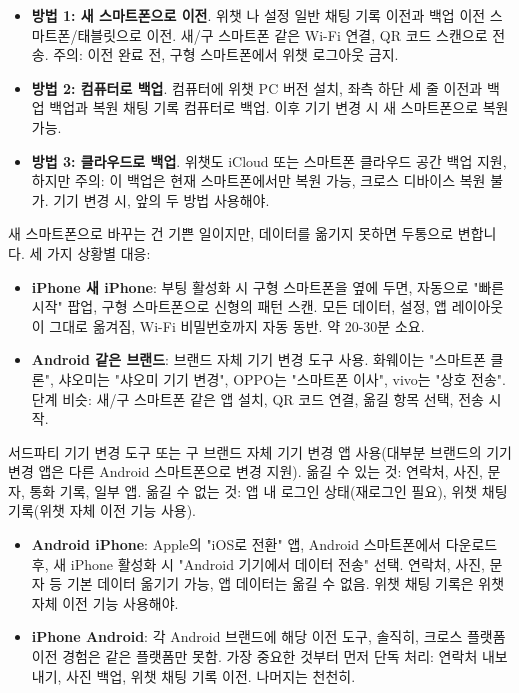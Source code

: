 \begin{itemize}
  \item \textbf{방법 1: 새 스마트폰으로 이전}. 위챗 나 설정 일반 채팅 기록 이전과 백업 이전 스마트폰/태블릿으로 이전. 새/구 스마트폰 같은 Wi-Fi 연결, QR 코드 스캔으로 전송. 주의: 이전 완료 전, 구형 스마트폰에서 위챗 로그아웃 금지.
  \item \textbf{방법 2: 컴퓨터로 백업}. 컴퓨터에 위챗 PC 버전 설치, 좌측 하단 세 줄 이전과 백업 백업과 복원 채팅 기록 컴퓨터로 백업. 이후 기기 변경 시 새 스마트폰으로 복원 가능.
  \item \textbf{방법 3: 클라우드로 백업}. 위챗도 iCloud 또는 스마트폰 클라우드 공간 백업 지원, 하지만 주의: 이 백업은 현재 스마트폰에서만 복원 가능, 크로스 디바이스 복원 불가. 기기 변경 시, 앞의 두 방법 사용해야.
\end{itemize}


새 스마트폰으로 바꾸는 건 기쁜 일이지만, 데이터를 옮기지 못하면 두통으로 변합니다. 세 가지 상황별 대응:


\begin{itemize}
  \item \textbf{iPhone 새 iPhone}: 부팅 활성화 시 구형 스마트폰을 옆에 두면, 자동으로 "빠른 시작" 팝업, 구형 스마트폰으로 신형의 패턴 스캔. 모든 데이터, 설정, 앱 레이아웃이 그대로 옮겨짐, Wi-Fi 비밀번호까지 자동 동반. 약 20-30분 소요.
  \item \textbf{Android 같은 브랜드}: 브랜드 자체 기기 변경 도구 사용. 화웨이는 "스마트폰 클론", 샤오미는 "샤오미 기기 변경", OPPO는 "스마트폰 이사", vivo는 "상호 전송". 단계 비슷: 새/구 스마트폰 같은 앱 설치, QR 코드 연결, 옮길 항목 선택, 전송 시작.
\end{itemize}


서드파티 기기 변경 도구 또는 구 브랜드 자체 기기 변경 앱 사용(대부분 브랜드의 기기 변경 앱은 다른 Android 스마트폰으로 변경 지원). 옮길 수 있는 것: 연락처, 사진, 문자, 통화 기록, 일부 앱. 옮길 수 없는 것: 앱 내 로그인 상태(재로그인 필요), 위챗 채팅 기록(위챗 자체 이전 기능 사용).


\begin{itemize}
  \item \textbf{Android iPhone}: Apple의 "iOS로 전환" 앱, Android 스마트폰에서 다운로드 후, 새 iPhone 활성화 시 "Android 기기에서 데이터 전송" 선택. 연락처, 사진, 문자 등 기본 데이터 옮기기 가능, 앱 데이터는 옮길 수 없음. 위챗 채팅 기록은 위챗 자체 이전 기능 사용해야.
  \item \textbf{iPhone Android}: 각 Android 브랜드에 해당 이전 도구, 솔직히, 크로스 플랫폼 이전 경험은 같은 플랫폼만 못함. 가장 중요한 것부터 먼저 단독 처리: 연락처 내보내기, 사진 백업, 위챗 채팅 기록 이전. 나머지는 천천히.
\end{itemize}


